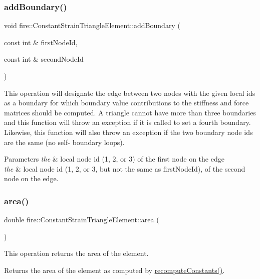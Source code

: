 \subsubsection{\texorpdfstring{add\+Boundary()}{addBoundary()}}
{\footnotesize\ttfamily void fire\+::\+Constant\+Strain\+Triangle\+Element\+::add\+Boundary (\begin{DoxyParamCaption}\item[{const int \&}]{first\+Node\+Id,  }\item[{const int \&}]{second\+Node\+Id }\end{DoxyParamCaption})}

This operation will designate the edge between two nodes with the given local ids as a boundary for which boundary value contributions to the stiffness and force matrices should be computed. A triangle cannot have more than three boundaries and this function will throw an exception if it is called to set a fourth boundary. Likewise, this function will also throw an exception if the two boundary node ids are the same (no self-\/ boundary loops). 
\begin{DoxyParams}{Parameters}
{\em the} & local node id (1, 2, or 3) of the first node on the edge \\
\hline
{\em the} & local node id (1, 2, or 3, but not the same as first\+Node\+Id), of the second node on the edge. \\
\hline
\end{DoxyParams}
\mbox{\label{a00764_acd197716c6bffaa3c7b472661f0e5ca4}} 
\subsubsection{\texorpdfstring{area()}{area()}}
{\footnotesize\ttfamily double fire\+::\+Constant\+Strain\+Triangle\+Element\+::area (\begin{DoxyParamCaption}{ }\end{DoxyParamCaption})}

This operation returns the area of the element. \begin{DoxyReturn}{Returns}
the area of the element as computed by \hyperlink{a00764_a40cf9432221b62db76e8b154e3e81e3d}{recompute\+Constants()}. 
\end{DoxyReturn}
\mbox{\label{a00764_ae0795172aa1ee5ffc68ec0e2c4aab9cc}} 
